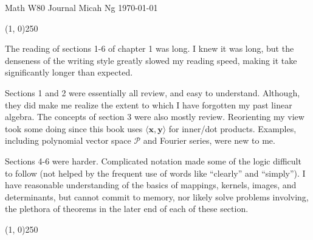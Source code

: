 \documentclass[11pt,letterpaper]{article}
\begin{document}
\noindent
Math W80 Journal \hfill Micah Ng \hfill \today

\begin{center}
\line(1, 0){250}
\end{center}

The reading of sections 1-6 of chapter 1 was long. I knew it was long, but the
denseness of the writing style greatly slowed my reading speed, making it take
significantly longer than expected.

Sections 1 and 2 were essentially all review, and easy to understand. Although,
they did make me realize the extent to which I have forgotten my past linear
algebra. The concepts of section 3 were also mostly review. Reorienting my view
took some doing since this book uses $\langle\mathbf{x},\mathbf{y}\rangle$ for
inner/dot products. Examples, including polynomial vector space $\mathscr{P}$
and Fourier series, were new to me.

Sections 4-6 were harder. Complicated notation made some of the logic difficult
to follow (not helped by the frequent use of words like ``clearly'' and
``simply''). I have reasonable understanding of the basics of mappings,
kernels, images, and determinants, but cannot commit to memory, nor likely
solve problems involving, the plethora of theorems in the later end of each
of these section.

\begin{center}
\line(1, 0){250}
\end{center}
\end{document}
